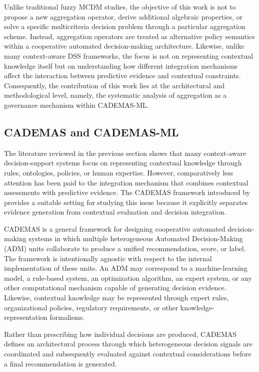 \documentclass[mathematics,article,submit,moreauthors]{Definitions/mdpi}
\begin{document}
Unlike traditional fuzzy MCDM studies, the objective of this work is not
to propose a new aggregation operator, derive additional algebraic
properties, or solve a specific multicriteria decision problem through a
particular aggregation scheme. Instead, aggregation operators are treated
as alternative policy semantics within a cooperative automated
decision-making architecture. Likewise, unlike many context-aware DSS
frameworks, the focus is not on representing contextual knowledge itself
but on understanding how different integration mechanisms affect the
interaction between predictive evidence and contextual constraints.
Consequently, the contribution of this work lies at the architectural and
methodological level, namely, the systematic analysis of aggregation as a
governance mechanism within CADEMAS-ML.

\subsection{CADEMAS and CADEMAS-ML}
\label{sect:cademas}

The literature reviewed in the previous section shows that many
context-aware decision-support systems focus on representing contextual
knowledge through rules, ontologies, policies, or human expertise.
However, comparatively less attention has been paid to the integration
mechanism that combines contextual assessments with predictive evidence.
The CADEMAS framework introduced by \citet{NovoaHernandez2026} provides
a suitable setting for studying this issue because it explicitly
separates evidence generation from contextual evaluation and decision
integration.

CADEMAS is a general framework for designing cooperative automated
decision-making systems in which multiple heterogeneous Automated
Decision-Making (ADM) units collaborate to produce a unified
recommendation, score, or label. The framework is intentionally agnostic
with respect to the internal implementation of these units. An ADM may
correspond to a machine-learning model, a rule-based system, an
optimization algorithm, an expert system, or any other computational
mechanism capable of generating decision evidence. Likewise, contextual
knowledge may be represented through expert rules, organizational
policies, regulatory requirements, or other knowledge-representation
formalisms.

Rather than prescribing how individual decisions are produced, CADEMAS
defines an architectural process through which heterogeneous decision
signals are coordinated and subsequently evaluated against contextual
considerations before a final recommendation is generated.
\end{document}
